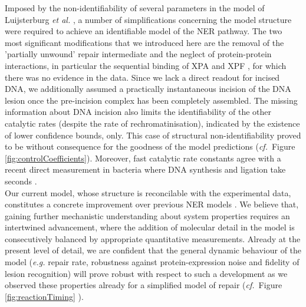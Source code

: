 Imposed by the non-identifiability of several parameters in the model of Luijsterburg \textit{et al.} \cite{Luijsterburg2010}, a number of simplifications concerning the model structure were required to achieve an identifiable model of the NER pathway. The two most significant modifications that we introduced here are the removal of the 'partially unwound' repair intermediate and the neglect of protein-protein interactions, in particular the sequential binding of XPA and XPF \cite{Volker2001}, for which there was no evidence in the data. Since we lack a direct readout for incised DNA, we additionally assumed a practically instantaneous incision of the DNA lesion once the pre-incision complex has been completely assembled. The missing information about DNA incision also limits the identifiability of the other catalytic rates (despite the rate of rechromatinisation), indicated by the existence of lower confidence bounds, only. This case of structural non-identifiability proved to be without consequence for the goodness of the model predictions (\textit{cf.}\ Figure \ref{fig:controlCoefficients}). Moreover, fast catalytic rate constants agree with a recent direct measurement in bacteria where DNA synthesis and ligation take seconds \cite{Uphoff2013}. \\
Our current model, whose structure is reconcilable with the experimental data, constitutes a concrete improvement over previous NER models \cite{Luijsterburg2010,Politi2005,Kesseler2007}. We believe that, gaining further mechanistic understanding about system properties requires an intertwined advancement, where the addition of molecular detail in the model is consecutively balanced by appropriate quantitative measurements. Already at the present level of detail, we are confident that the general dynamic behaviour of the model (\textit{e.g.} repair rate, robustness against protein-expression noise and fidelity of lesion recognition) will prove robust with respect to such a development as we observed these properties already for a simplified model of repair (\textit{cf.}\ Figure \ref{fig:reactionTiming} \cite{Verbruggen2014}).    
       

